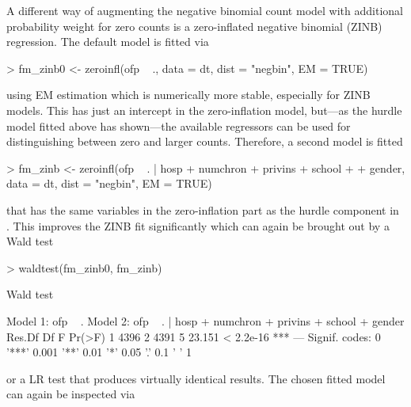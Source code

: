 \documentclass{Z}
\begin{document}
A different way of augmenting the negative binomial count model 
with additional probability weight for zero counts is a zero-inflated
negative binomial (ZINB) regression. The default model is fitted via
\begin{Schunk}
\begin{Sinput}
> fm_zinb0 <- zeroinfl(ofp ~ ., data = dt, dist = "negbin", EM = TRUE)
\end{Sinput}
\end{Schunk}
using EM estimation which is numerically more stable, especially for ZINB models.
This has just an intercept in the zero-inflation model, but---as the hurdle
model  fitted above has shown---the available regressors can be
used for distinguishing between zero and larger counts. Therefore, a second
model is fitted
\begin{Schunk}
\begin{Sinput}
> fm_zinb <- zeroinfl(ofp ~ . | hosp + numchron + privins + school + 
+     gender, data = dt, dist = "negbin", EM = TRUE)
\end{Sinput}
\end{Schunk}
that has the same variables in the zero-inflation part as the hurdle
component in . This improves the ZINB fit significantly
which can again be brought out by a Wald test
\begin{Schunk}
\begin{Sinput}
> waldtest(fm_zinb0, fm_zinb)
\end{Sinput}
\begin{Soutput}
Wald test

Model 1: ofp ~ .
Model 2: ofp ~ . | hosp + numchron + privins + school + gender
  Res.Df   Df      F    Pr(>F)    
1   4396                          
2   4391    5 23.151 < 2.2e-16 ***
---
Signif. codes:  0 '***' 0.001 '**' 0.01 '*' 0.05 '.' 0.1 ' ' 1 
\end{Soutput}
\end{Schunk}
or a LR test  that produces virtually identical
results. The chosen fitted model can again be inspected via
\end{document}
